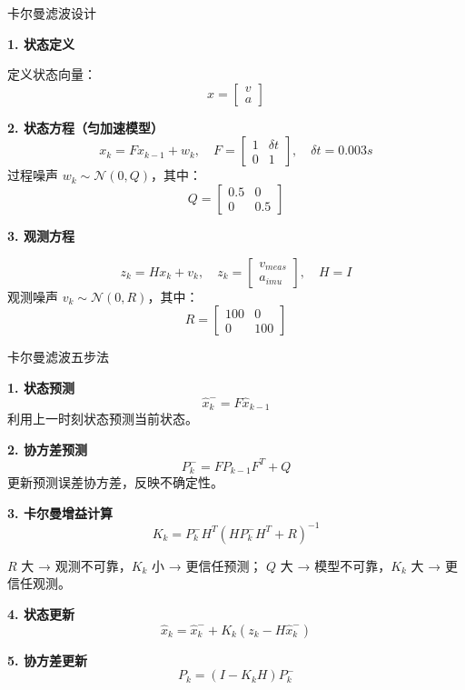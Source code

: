 \documentclass{beamer}
\begin{document}
	\begin{frame}{卡尔曼滤波设计}
		\small
		
		\textbf{1. 状态定义}
		{\scriptsize
		定义状态向量：
		\[
		x = \begin{bmatrix} v \\ a \end{bmatrix}
		\]
		
		\textbf{2. 状态方程（匀加速模型）}
		\[
		x_k = F x_{k-1} + w_k, \quad F = \begin{bmatrix} 1 & \delta t \\ 0 & 1 \end{bmatrix}, \quad \delta t = 0.003s
		\]
		过程噪声 $w_k \sim \mathcal{N}(0, Q)$，其中：
		\[
		Q = \begin{bmatrix} 0.5 & 0 \\ 0 & 0.5 \end{bmatrix}
		\]
		
		\textbf{3. 观测方程}
		
		\[
		z_k = H x_k + v_k, \quad z_k = \begin{bmatrix} v_{meas} \\ a_{imu} \end{bmatrix}, \quad H = I
		\]
		观测噪声 $v_k \sim \mathcal{N}(0, R)$，其中：
		\[
		R = \begin{bmatrix} 100 & 0 \\ 0 & 100 \end{bmatrix}
		\]}
		
	\end{frame}
	
	\begin{frame}{卡尔曼滤波五步法}
		\small
		
		\textbf{1. 状态预测}
		\[
		\hat{x}_k^- = F \hat{x}_{k-1}
		\]
		利用上一时刻状态预测当前状态。
		
		\textbf{2. 协方差预测}
		\[
		P_k^- = F P_{k-1} F^T + Q
		\]
		更新预测误差协方差，反映不确定性。
		
		\textbf{3. 卡尔曼增益计算}
		\[
		K_k = P_k^- H^T (H P_k^- H^T + R)^{-1}
		\]

		$R$ 大 → 观测不可靠，$K_k$ 小 → 更信任预测；
		$Q$ 大 → 模型不可靠，$K_k$ 大 → 更信任观测。

		
		\textbf{4. 状态更新}
		\[
		\hat{x}_k = \hat{x}_k^- + K_k (z_k - H \hat{x}_k^-)
		\]
		
		\textbf{5. 协方差更新}
		\[
		P_k = (I - K_k H) P_k^-
		\]
		
		
	\end{frame}
	
\end{document}
